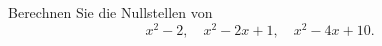\begin{aufg}[0]
 Berechnen Sie die Nullstellen von 
\[ x^2-2, \quad x^2-2x+1, \quad x^2 -4x +10. \]
\end{aufg}